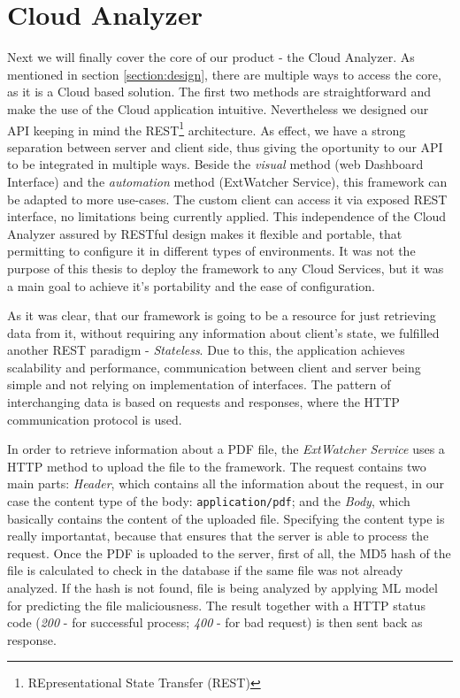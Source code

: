 \section{Cloud Analyzer}
\label{section:cloudApi}
Next we will finally cover the core of our product - the Cloud Analyzer. As mentioned in section \ref{section:design}, there are multiple ways to access the core, as it is a Cloud based solution. The first two methods are straightforward and make the use of the Cloud application intuitive. Nevertheless we designed our API keeping in mind the REST\footnote{REpresentational State Transfer (REST)} architecture. As effect, we have a strong separation between server and client side, thus giving the oportunity to our API to be integrated in multiple ways. Beside the \textit{visual} method (web Dashboard Interface) and the \textit{automation} method (ExtWatcher Service), this framework can be adapted to more use-cases. The custom client can access it via exposed REST interface, no limitations being currently applied. This independence of the Cloud Analyzer assured by RESTful design makes it flexible and portable, that permitting to configure it in different types of environments. It was not the purpose of this thesis to deploy the framework to any Cloud Services, but it was a main goal to achieve it's portability and the ease of configuration. \par 
As it was clear, that our framework is going to be a resource for just retrieving data from it, without requiring any information about client's state, we fulfilled another REST paradigm - \textit{Stateless}. Due to this, the application achieves scalability and performance, communication between client and server being simple and not relying on implementation of interfaces. The pattern of interchanging data is based on requests and responses, where the HTTP communication protocol is used. \par
In order to retrieve information about a PDF file, the \textit{ExtWatcher Service} uses a  HTTP method to upload the file to the framework. The request contains two main parts: \textit{Header}, which contains all the information about the request, in our case the content type of the body: \texttt{application/pdf}; and the \textit{Body}, which basically contains the content of the uploaded file. Specifying the content type is really importantat, because that ensures that the server is able to process the request. Once the PDF is uploaded to the server, first of all, the MD5 hash of the file is calculated to check in the database if the same file was not already analyzed. If the hash is not found, file is being analyzed by applying ML model for predicting the file maliciousness. The result together with a HTTP status code (\textit{200} - for successful process; \textit{400} - for bad request) is then sent back as response. \par
